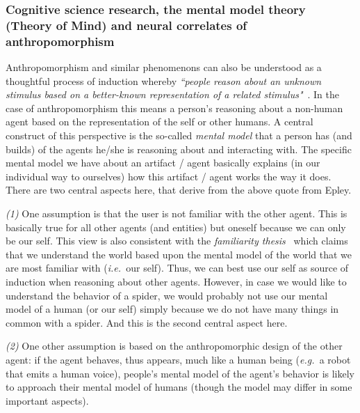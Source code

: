 \documentclass{frontiersSCNS} %
\newcommand{\eg}{{\textit{e.g.~}}}
\newcommand{\ie}{{\textit{i.e.~}}}
\begin{document}
\subsubsection{Cognitive science research, the mental model theory (Theory of Mind)
and neural correlates of anthropomorphism}
\label{sec:cognitive-expl}

Anthropomorphism and similar phenomenons can also be understood as a thoughtful
process of induction whereby \textit{``people reason about an unknown stimulus
based on a better-known representation of a related
stimulus"}~\citep{epley_when_2008}. In the case of anthropomorphism this means a
person's reasoning about a non-human agent based on the representation of the
self or other humans. A central construct of this perspective is the so-called
\textit{mental model} that a person has (and builds) of the agents he/she is
reasoning about and interacting with. The specific mental model we have about an
artifact / agent basically explains (in our individual way to ourselves) how
this artifact / agent works the way it does.  There are two central aspects
here, that derive from the above quote from Epley.

\textit{(1)} One assumption is that the user is not familiar with the other
agent. This is basically true for all other agents (and entities) but oneself
because we can only be our self. This view is also consistent with the
\emph{familiarity thesis}~\citep{hegel_understanding_2008} which claims that we
understand the world based upon the mental model of the world that we are most
familiar with (\ie our self). Thus, we can best use our self as source of induction
when reasoning about other agents. However, in case we would like to understand
the behavior of a spider, we would probably not use our mental model of a human
(or our self) simply because we do not have many things in common with a spider.
And this is the second central aspect here.

\textit{(2)} One other assumption is based on the anthropomorphic design of the
other agent: if the agent behaves, thus appears, much like a human being (\eg a
robot that emits a human voice), people's mental model of the agent's behavior
is likely to approach their mental model of humans (though the model may differ
in some important aspects).
\end{document}
